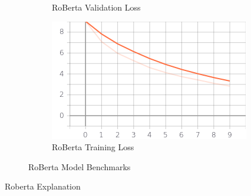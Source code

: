 \documentclass[a4paper,12pt]{report}
\begin{document}
\begin{figure}
\begin{subfigure}[b]{0.475\textwidth}
		\caption{\small RoBerta Validation Loss}
		\label{robertaValLoss}
	\end{subfigure}
	\hfill
	\begin{subfigure}[b]{0.475\textwidth}
		\centering
		\includegraphics[width=\textwidth]{../images/Roberta_Train_Loss.png}
		\caption{\small RoBerta Training Loss}
		\label{robertaTrainloss}
	\end{subfigure}
	\caption{RoBerta Model Benchmarks}
	\label{robertaBenchmarks}
\end{figure}

Roberta Explanation
\end{document}
